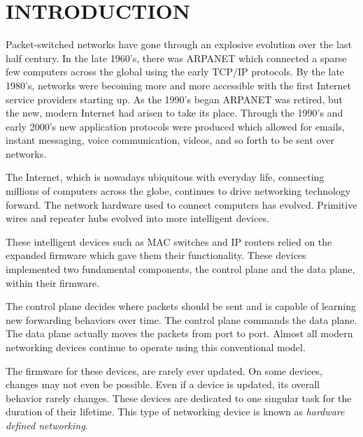 \chapter{INTRODUCTION} \label{ch:intro}

%
%




Packet-switched networks have gone through an explosive evolution over the last half century. In the late 1960's, there was ARPANET which connected a sparse few computers across the global using the early TCP/IP protocols. By the late 1980's, networks were becoming more and more accessible with the first Internet service providers starting up. As the 1990's began ARPANET was retired, but the new, modern Internet had arisen to take its place. Through the 1990's and early 2000's new application protocols were produced which allowed for emails, instant messaging, voice communication, videos, and so forth to be sent over networks. 

The Internet, which is nowadays ubiquitous with everyday life, connecting millions of computers across the globe, continues to drive networking technology forward. The network hardware used to connect computers has evolved. Primitive wires and repeater hubs evolved into more intelligent devices. 

These intelligent devices such as MAC switches and IP routers relied on the expanded firmware which gave them their functionality. These devices implemented two fundamental components, the control plane and the data plane, within their firmware.

The control plane decides where packets should be sent and is capable of learning new forwarding behaviors over time. The control plane commands the data plane. The data plane actually moves the packets from port to port. Almost all modern networking devices continue to operate using this conventional model.  

The firmware for these devices, are rarely ever updated. On some devices, changes may not even be possible. Even if a device is updated, its overall behavior rarely changes. These devices are dedicated to one singular task for the duration of their lifetime. This type of networking device is known as \emph{hardware defined networking}.

